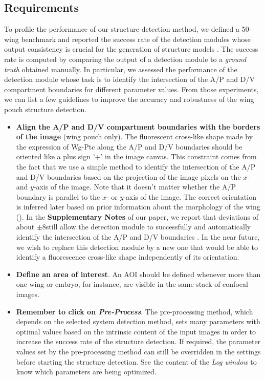 \subsection{Requirements} \label{sec:unsupervised_detection_guidelines}
To profile the performance of our structure detection method, we defined a 50-wing benchmark and reported the success rate of the detection modules whose output consistency is crucial for the generation of structure models \autocite{schaffter2013}. The success rate is computed by comparing the output of a detection module to a \textit{ground truth} obtained manually. In particular, we assessed the performance of the detection module whose task is to identify the intersection of the A/P and D/V compartment boundaries for different parameter values. From those experiments, we can list a few guidelines to improve the accuracy and robustness of the wing pouch structure detection.

\begin{itemize}
 \item \textbf{Align the A/P and D/V compartment boundaries with the borders of the image} (\droso wing pouch only). The fluorescent cross-like shape made by the expression of Wg-Ptc along the A/P and D/V boundaries should be oriented like a plus sign '+' in the image canvas. This constraint comes from the fact that we use a simple method to identify the intersection of the A/P and D/V boundaries based on the projection of the image pixels on the $x$- and $y$-axis of the image. Note that it doesn't matter whether the A/P boundary is parallel to the $x$- or $y$-axis of the image. The correct orientation is inferred later based on prior information about the morphology of the wing (). In the \textbf{Supplementary Notes} of our paper, we report that deviations of about $\pm8$\degree still allow the detection module to successfully and automatically identify the intersection of the A/P and D/V boundaries \autocite{schaffter2013}. In the near future, we wish to replace this detection module by a new one that would be able to identify a fluorescence cross-like shape independently of its orientation.

 \item \textbf{Define an area of interest}. An AOI should be defined whenever more than one wing or embryo, for instance, are visible in the same stack of confocal images.

 \item \textbf{Remember to click on \textit{Pre-Process}}. The pre-processing method, which depends on the selected system detection method, sets many parameters with optimal values based on the intrinsic content of the input images in order to increase the success rate of the structure detection. If required, the parameter values set by the pre-processing method can still be overridden in the settings before starting the structure detection. See the content of the \textit{Log window} to know which parameters are being optimized.
\end{itemize}

